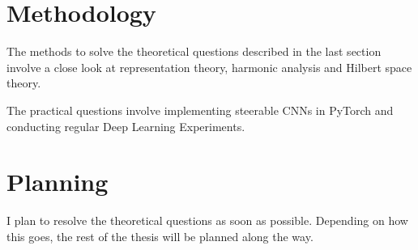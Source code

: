 \documentclass[12pt, a4paper]{article}
\theoremstyle{plain}
\theoremstyle{definition}
\theoremstyle{remark}
\begin{document}
\section{Methodology}

The methods to solve the theoretical questions described in the last section involve a close look at representation theory, harmonic analysis and Hilbert space theory.

The practical questions involve implementing steerable CNNs in PyTorch and conducting regular Deep Learning Experiments.

\section{Planning}

I plan to resolve the theoretical questions as soon as possible. Depending on how this goes, the rest of the thesis will be planned along the way.




\end{document}
